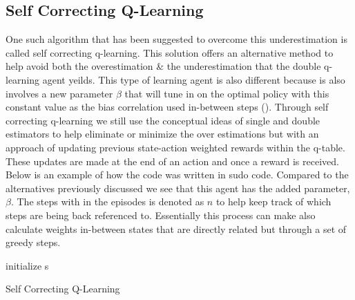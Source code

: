 \documentclass[letterpaper]{article}
\begin{document}
\subsection{Self Correcting Q-Learning}
One such algorithm that has been suggested to overcome this underestimation is called self correcting q-learning.  This solution offers an alternative method to help avoid both the overestimation \& the underestimation that the double q-learning agent yeilds.  This type of learning agent is also different because is also involves a new parameter $\beta$ that will tune in on the optimal policy with this constant value as the bias correlation used in-between steps (\cite{zhu2021selfcorrecting}).  Through self correcting q-learning we still use the conceptual ideas of single and double estimators to help eliminate or minimize the over estimations but with an approach of updating previous state-action weighted rewards within the q-table.  These updates are made at the end of an action and once a reward is received.  Below is an example of how the code was written in sudo code. Compared to the alternatives previously discussed we see that this agent has the added parameter, $\beta$.  The steps with in the episodes is denoted as $n$  to help keep track of which steps are being back referenced to. Essentially this process can make also calculate weights in-between states that are directly related but through a set of greedy steps.  

\begin{algorithm}[h]
  initialize s\;
 \caption{Self Correcting Q-Learning}
\end{algorithm}
\end{document}
